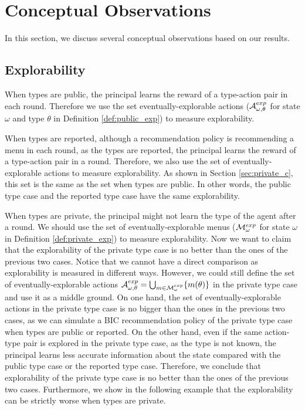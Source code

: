 
\section{Conceptual Observations}
In this section, we discuss several conceptual observations based on our results.

\subsection{Explorability}
\label{sec:exp}
When types are public, the principal learns the reward of a type-action pair in each round. Therefore we use the set eventually-explorable actions ($\mathcal{A}^{exp}_{\omega,\theta}$ for state $\omega$ and type $\theta$ in Definition \ref{def:public_exp}) to measure explorability.

When types are reported, although a recommendation policy is recommending a menu in each round, as the types are reported, the principal learns the reward of a type-action pair in a round. Therefore, we also use the set of eventually-explorable actions to measure explorability. As shown in Section \ref{sec:private_c}, this set is the same as the set when types are public. In other words, the public type case and the reported type case have the same explorability.

When types are private, the principal might not learn the type of the agent after a round. We should use the set of eventually-explorable menus ($\mathcal{M}^{exp}_{\omega}$ for state $\omega$ in Definition \ref{def:private_exp}) to measure explorability. Now we want to claim that the explorability of the private type case is no better than the ones of the previous two cases. Notice that we cannot have a direct comparison as explorability is measured in different ways. However, we could still define the set of eventually-explorable actions $\mathcal{A}^{exp}_{\omega,\theta} = \bigcup_{m\in \mathcal{M}^{exp}_{\omega}} \{ m(\theta)\}$ in the private type case and use it as a middle ground. On one hand, the set of eventually-explorable actions in the private type case is no bigger than the ones in the previous two cases, as we can simulate a BIC recommendation policy of the private type case when types are public or reported. On the other hand, even if the same action-type pair is explored in the private type case, as the type is not known, the principal learns less accurate information about the state compared with the public type case or the reported type case. Therefore, we conclude that explorability of the private type case is no better than the ones of the previous two cases.  Furthermore, we show in the following example that the explorability can be strictly worse when types are private.

